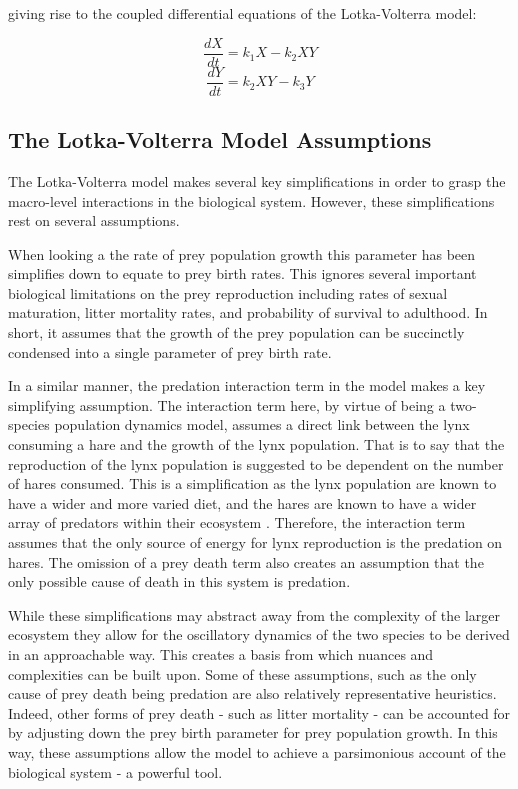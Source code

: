 \documentclass{article}
\begin{document}
giving rise to the coupled differential equations of the Lotka-Volterra model:

\begin{equation}
    \frac{dX}{dt} = k_1X - k_2XY
\end{equation}
\begin{equation}
    \frac{dY}{dt} = k_2XY - k_3Y
\end{equation}

\subsection{The Lotka-Volterra Model Assumptions}
The Lotka-Volterra model makes several key simplifications in order to grasp the macro-level interactions in the biological system. However, these simplifications rest on several assumptions. 

When looking a the rate of prey population growth this parameter has been simplifies down to equate to prey birth rates. This ignores several important biological limitations on the prey reproduction including rates of sexual maturation, litter mortality rates, and probability of survival to adulthood. In short, it assumes that the growth of the prey population can be succinctly condensed into a single parameter of prey birth rate. 

In a similar manner, the predation interaction term in the model makes a key simplifying assumption. The interaction term here, by virtue of being a two-species population dynamics model, assumes a direct link between the lynx consuming a hare and the growth of the lynx population. That is to say that the reproduction of the lynx population is suggested to be dependent on the number of hares consumed. This is a simplification as the lynx population are known to have a wider and more varied diet, and the hares are known to have a wider array of predators within their ecosystem \parencite{king_geometry_2001, stenseth_population_1997}. Therefore, the interaction term assumes that the only source of energy for lynx reproduction is the predation on hares. The omission of a prey death term also creates an assumption that the only possible cause of death in this system is predation. 

While these simplifications may abstract away from the complexity of the larger ecosystem they allow for the oscillatory dynamics of the two species to be derived in an approachable way. This creates a basis from which nuances and complexities can be built upon. Some of these assumptions, such as the only cause of prey death being predation are also relatively representative heuristics. Indeed, other forms of prey death - such as litter mortality - can be accounted for by adjusting down the prey birth parameter for prey population growth. In this way, these assumptions allow the model to achieve a parsimonious account of the biological system - a powerful tool. 
\end{document}
